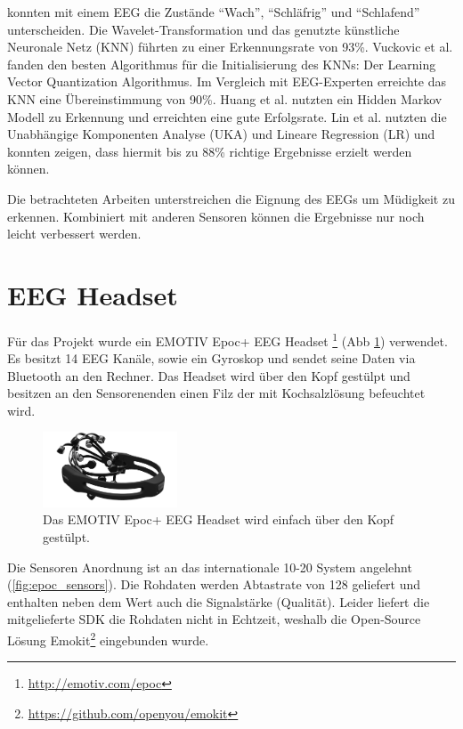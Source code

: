 {\cite{Subasi:2005:ARA:1707423.1707550} konnten mit einem EEG die Zustände "`Wach"', "`Schläfrig"' und "`Schlafend"' unterscheiden. Die Wavelet-Transformation und das genutzte künstliche Neuronale Netz (KNN) führten zu einer Erkennungsrate von 93\%. Vuckovic et al. fanden den besten Algorithmus für die Initialisierung des KNNs: Der Learning Vector Quantization Algorithmus. Im Vergleich mit EEG-Experten erreichte das KNN eine Übereinstimmung von 90\%. Huang et al. \cite{Huang_548971} nutzten ein Hidden Markov Modell zu Erkennung und erreichten eine gute Erfolgsrate.
Lin et al. \cite{Lin05eeg-baseddrowsiness} nutzten die Unabhängige Komponenten Analyse (UKA) und Lineare Regression (LR) und konnten zeigen, dass hiermit  bis zu 88\% richtige Ergebnisse erzielt werden können. 

Die betrachteten Arbeiten unterstreichen die Eignung des EEGs um Müdigkeit zu erkennen. Kombiniert mit anderen Sensoren können die Ergebnisse nur noch leicht verbessert werden.

\section{EEG Headset}
\label{chap:eeg}
Für das Projekt wurde ein EMOTIV Epoc+ EEG Headset \footnote{\url{http://emotiv.com/epoc}} (Abb \ref{fig:epoc_eeg}) verwendet. Es besitzt 14 EEG Kanäle, sowie ein Gyroskop und sendet seine Daten via Bluetooth an den Rechner. Das Headset wird über den Kopf gestülpt und besitzen an den Sensorenenden einen Filz der mit Kochsalzlösung befeuchtet wird. 

\begin{figure}[h] 
  \begin{center}
    \includegraphics[width=4cm]{epoc_eeg}
    \caption[EMOTIV Epoc]{Das EMOTIV Epoc+ EEG Headset wird einfach über den Kopf gestülpt.\label{fig:epoc_eeg}}
  \end{center}
\end{figure}

Die Sensoren Anordnung ist an das internationale 10-20 System angelehnt (\ref{fig:epoc_sensors}). Die Rohdaten werden Abtastrate von 128 geliefert und enthalten neben dem Wert auch die Signalstärke (Qualität). Leider liefert die mitgelieferte SDK die Rohdaten nicht in Echtzeit, weshalb die Open-Source Lösung Emokit\footnote{\url{https://github.com/openyou/emokit}} eingebunden wurde.

}
